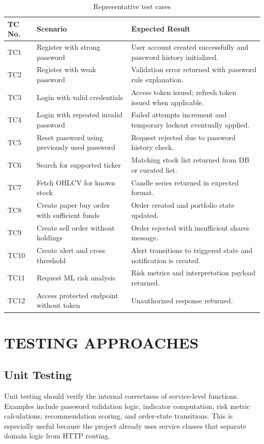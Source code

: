 \documentclass[12pt,a4paper]{report}
\begin{document}
\begin{table}[H]
\centering
\caption{Representative test cases}
\begin{tabularx}{\textwidth}{>{\raggedright\arraybackslash}p{0.8in} >{\raggedright\arraybackslash}p{2.3in} X}
\toprule
\textbf{TC No.} & \textbf{Scenario} & \textbf{Expected Result} \\
\midrule
TC1 & Register with strong password & User account created successfully and password history initialized. \\
TC2 & Register with weak password & Validation error returned with password rule explanation. \\
TC3 & Login with valid credentials & Access token issued; refresh token issued when applicable. \\
TC4 & Login with repeated invalid password & Failed attempts increment and temporary lockout eventually applied. \\
TC5 & Reset password using previously used password & Request rejected due to password history check. \\
TC6 & Search for supported ticker & Matching stock list returned from DB or curated list. \\
TC7 & Fetch OHLCV for known stock & Candle series returned in expected format. \\
TC8 & Create paper buy order with sufficient funds & Order created and portfolio state updated. \\
TC9 & Create sell order without holdings & Order rejected with insufficient shares message. \\
TC10 & Create alert and cross threshold & Alert transitions to triggered state and notification is created. \\
TC11 & Request ML risk analysis & Risk metrics and interpretation payload returned. \\
TC12 & Access protected endpoint without token & Unauthorized response returned. \\
\bottomrule
\end{tabularx}
\end{table}

\section{TESTING APPROACHES}
\subsection{Unit Testing}
Unit testing should verify the internal correctness of service-level functions. Examples include password validation logic, indicator computation, risk metric calculations, recommendation scoring, and order-state transitions. This is especially useful because the project already uses service classes that separate domain logic from HTTP routing.
\end{document}
